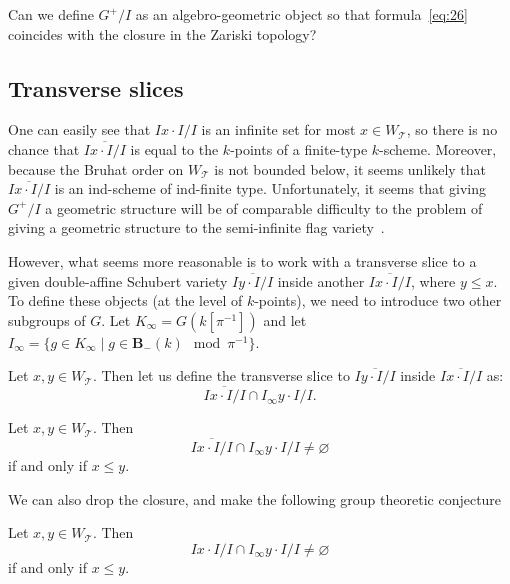 \documentclass[ALCO,ThmDefs,Unicode]{cedram}
\newcommand{\bB}{\mathbf{B}}
\newcommand{\cT}{\mathcal{T}}
\newcommand{\suchthat}{\mid}
\newcommand{\WTits}{W_{\TitsCone}}
\newcommand{\TitsCone}{\cT}
\begin{document}
\begin{ques}\label{ques:define-double-affine-flag-var}
Can we define $G^+/I$ as an algebro-geometric object so that formula~\eqref{eq:26} coincides with the closure in the Zariski topology?
\end{ques}

\subsection{Transverse slices}

One can easily see that $Ix \cdot I/I$ is an infinite set for most $x \in \WTits$, so there is no chance that $\overline{Ix \cdot I/I}$ is equal to the $k$-points of a finite-type $k$-scheme. Moreover, because the Bruhat order on $\WTits$ is not bounded below, it seems unlikely that $\overline{Ix \cdot I/I}$ is an ind-scheme of ind-finite type. Unfortunately, it seems that giving $G^+/I$ a geometric structure will be of comparable difficulty to the problem of giving a geometric structure to the semi-infinite flag variety~\cite{FM}.

However, what seems more reasonable is to work with a transverse slice to a given double-affine Schubert variety $\overline{I y \cdot I/I}$ inside another $\overline{I x\cdot I/I}$, where $y\leq x$. To define these objects (at the level of $k$-points), we need to introduce two other subgroups of $G$. Let $K_\infty = G(k[\pi^{-1}])$ and let $I_{\infty} = \{ g \in K_\infty \suchthat g \in \bB_-(k) \mod \pi^{-1} \}$.

\begin{defi}
Let $x,y \in \WTits$. Then let us define the transverse slice to $\overline{I y \cdot I/I}$ inside $\overline{I x \cdot I/I}$ as:
\begin{equation}\label{eq:27}
\overline{I x \cdot I/I} \cap I_\infty y \cdot I/I.
\end{equation}
\end{defi}

\begin{conj}
Let $x,y \in \WTits$. Then
\begin{equation}\label{eq:28H}
\overline{I x \cdot I/I} \cap I_\infty y \cdot I/I \neq \varnothing
\end{equation}
if and only if $x \leq y$.
\end{conj}

We can also drop the closure, and make the following group theoretic conjecture
\begin{conj}
Let $x,y \in \WTits$. Then
\begin{equation}\label{eq:28}
I x \cdot I/I \cap I_\infty y \cdot I/I \neq \varnothing
\end{equation}
if and only if $x \leq y$.
\end{conj}
\end{document}
